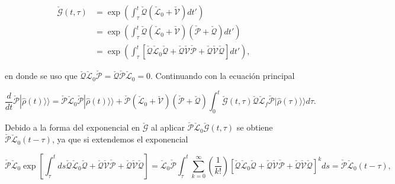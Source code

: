 \begin{appendixs}
\begin{align*}
    \check{\mathcal{G}}(t,\tau) & = \exp\left(  \int_{\tau}^{t}\check{\mathcal{Q}}(\check{\mathcal{L}}_{0} + \check{\mathcal{V}})dt' \right) \\
        & = \exp\left(  \int_{\tau}^{t}\check{\mathcal{Q}}(\check{\mathcal{L}}_{0}+\check{\mathcal{V}})(\check{\mathcal{P}}+\check{\mathcal{Q}}) dt' \right) \\
            & = \exp\left(  \int_{\tau}^{t}\left[\check{\mathcal{Q}}\check{\mathcal{L}}_{0}\check{\mathcal{Q}}+ \check{\mathcal{Q}}\check{\mathcal{V}}\check{\mathcal{P}}+\check{\mathcal{Q}}\check{\mathcal{V}}\check{\mathcal{Q}}\right] dt' \right),       
\end{align*}

en donde se uso que $\check{\mathcal{Q}}\check{\mathcal{L}}_{0}\check{\mathcal{P}} = \check{\mathcal{Q}}\check{\mathcal{P}}\check{\mathcal{L}}_{0}=0$. Continuando con la ecuación principal

\begin{equation*}
    \frac{d}{dt}\check{\mathcal{P}}|\hat{\rho}(t)\rangle \rangle = \check{\mathcal{P}}\check{\mathcal{L}}_{0}\check{\mathcal{P}}|\hat{\rho}(t)\rangle \rangle + \check{\mathcal{P}}(\check{\mathcal{L}}_{0} + \check{\mathcal{V}})(\check{\mathcal{P}}+\check{\mathcal{Q}})\int_{0}^{t}\check{\mathcal{G}}(t,\tau)\check{\mathcal{Q}}\check{\mathcal{L}}_{f} \check{\mathcal{P}}|\hat{\rho}(\tau)\rangle \rangle d\tau.       
\end{equation*}

Debido a la forma del exponencial en $\check{\mathcal{G}}$ al aplicar $\check{\mathcal{P}}\check{\mathcal{L}}_{0}\check{\mathcal{G}}(t,\tau)$ se obtiene $\check{\mathcal{P}}\check{\mathcal{L}}_{0}(t-\tau)$, ya que si extendemos el exponencial

\begin{equation*}
    \check{\mathcal{P}}\check{\mathcal{L}}_{0}\exp\left[\int_{\tau}^{t}ds\check{\mathcal{Q}}\check{\mathcal{L}}_{0}\check{\mathcal{Q}}+ \check{\mathcal{Q}}\check{\mathcal{V}}\check{\mathcal{P}}+\check{\mathcal{Q}}\check{\mathcal{V}}\check{\mathcal{Q}} \right] = \check{\mathcal{L}}_{0}\check{\mathcal{P}}\int_{\tau}^{t}\sum_{k=0}^{\infty}\left(\frac{1}{k!} \right)\left[\check{\mathcal{Q}}\check{\mathcal{L}}_{0}\check{\mathcal{Q}}+ \check{\mathcal{Q}}\check{\mathcal{V}}\check{\mathcal{P}}+\check{\mathcal{Q}}\check{\mathcal{V}}\check{\mathcal{Q}} \right]^{k}ds = \check{\mathcal{P}}\check{\mathcal{L}}_{0}(t-\tau), 
\end{equation*}


\end{appendixs}
